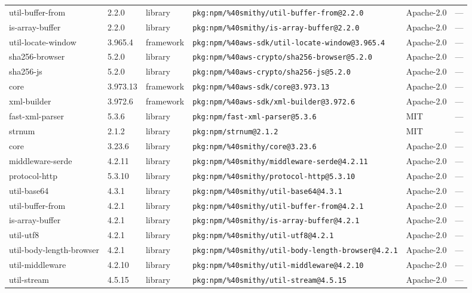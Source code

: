 \documentclass[11pt]{article}
\begin{document}
\begin{longtable}{|l|l|l|p{2.2cm}|l|p{4cm}|}
util-buffer-from & 2.2.0 & library & \texttt{pkg:npm/\%40smithy/util-buffer-from@2.2.0} & Apache-2.0 & — \\
is-array-buffer & 2.2.0 & library & \texttt{pkg:npm/\%40smithy/is-array-buffer@2.2.0} & Apache-2.0 & — \\
util-locate-window & 3.965.4 & framework & \texttt{pkg:npm/\%40aws-sdk/util-locate-window@3.965.4} & Apache-2.0 & — \\
sha256-browser & 5.2.0 & library & \texttt{pkg:npm/\%40aws-crypto/sha256-browser@5.2.0} & Apache-2.0 & — \\
sha256-js & 5.2.0 & library & \texttt{pkg:npm/\%40aws-crypto/sha256-js@5.2.0} & Apache-2.0 & — \\
core & 3.973.13 & framework & \texttt{pkg:npm/\%40aws-sdk/core@3.973.13} & Apache-2.0 & — \\
xml-builder & 3.972.6 & framework & \texttt{pkg:npm/\%40aws-sdk/xml-builder@3.972.6} & Apache-2.0 & — \\
fast-xml-parser & 5.3.6 & library & \texttt{pkg:npm/fast-xml-parser@5.3.6} & MIT & — \\
strnum & 2.1.2 & library & \texttt{pkg:npm/strnum@2.1.2} & MIT & — \\
core & 3.23.6 & library & \texttt{pkg:npm/\%40smithy/core@3.23.6} & Apache-2.0 & — \\
middleware-serde & 4.2.11 & library & \texttt{pkg:npm/\%40smithy/middleware-serde@4.2.11} & Apache-2.0 & — \\
protocol-http & 5.3.10 & library & \texttt{pkg:npm/\%40smithy/protocol-http@5.3.10} & Apache-2.0 & — \\
util-base64 & 4.3.1 & library & \texttt{pkg:npm/\%40smithy/util-base64@4.3.1} & Apache-2.0 & — \\
util-buffer-from & 4.2.1 & library & \texttt{pkg:npm/\%40smithy/util-buffer-from@4.2.1} & Apache-2.0 & — \\
is-array-buffer & 4.2.1 & library & \texttt{pkg:npm/\%40smithy/is-array-buffer@4.2.1} & Apache-2.0 & — \\
util-utf8 & 4.2.1 & library & \texttt{pkg:npm/\%40smithy/util-utf8@4.2.1} & Apache-2.0 & — \\
util-body-length-browser & 4.2.1 & library & \texttt{pkg:npm/\%40smithy/util-body-length-browser@4.2.1} & Apache-2.0 & — \\
util-middleware & 4.2.10 & library & \texttt{pkg:npm/\%40smithy/util-middleware@4.2.10} & Apache-2.0 & — \\
util-stream & 4.5.15 & library & \texttt{pkg:npm/\%40smithy/util-stream@4.5.15} & Apache-2.0 & — \\

\end{longtable}
\end{document}
